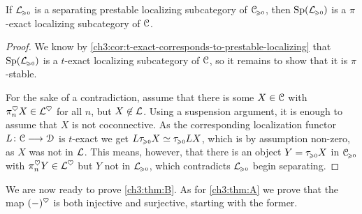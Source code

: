 \begin{lemma}
    \label{ch3:lm:separating-then-pi-exact}
    If $\L\geqz$ is a separating prestable localizing subcategory of $\C\geqz$, then $\Sp(\L\geqz)$ is a $\pi$-exact localizing subcategory of $\C$. 
\end{lemma}
\begin{proof}
    We know by \cref{ch3:cor:t-exact-corresponds-to-prestable-localizing} that $\Sp(\L\geqz)$ is a $t$-exact localizing subcategory of $\C$, so it remains to show that it is $\pi$-stable. 

    For the sake of a contradiction, assume that there is some $X\in \C$ with $\pi_n^\heart X\in \L^\heart$ for all $n$, but $X\not\in \L$. Using a suspension argument, it is enough to assume that $X$ is not coconnective. As the corresponding localization functor $L\:\C\to \D$ is $t$-exact we get $L\tau\geqz X \simeq \tau\geqz LX$, which is by assumption non-zero, as $X$ was not in $\L$. This means, however, that there is an object $Y=\tau\geqz X$ in $\C\geqz$ with $\pi_n^\heart Y \in \L^\heart$ but $Y$ not in $\L\geqz$, which contradicts $\L\geqz$ begin separating.  
\end{proof}









We are now ready to prove \cref{ch3:thm:B}. As for \cref{ch3:thm:A} we prove that the map $(-)^\heart$ is both injective and surjective, starting with the former. 


